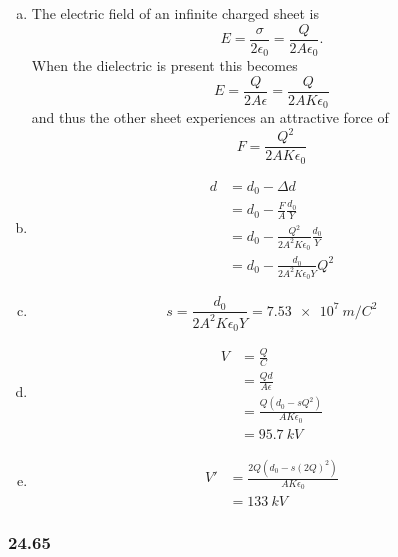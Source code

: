 \documentclass{article}
\begin{document}
\begin{enumerate}[(a)]
  \item The electric field of an infinite charged sheet is \[E = \frac{\sigma}{2 \epsilon_0} = \frac{Q}{2 A \epsilon_0}.\] When the dielectric is present this becomes \[E = \frac{Q}{2 A \epsilon} = \frac{Q}{2 A K \epsilon_0}\] and thus the other sheet experiences an attractive force of \[F = \frac{Q^2}{2 A K \epsilon_0}\]

  \item

        \begin{align*}
          d & = d_0 - \Delta d                                     \\
            & = d_0 - \frac{F}{A} \frac{d_0}{Y}                    \\
            & = d_0 - \frac{Q^2}{2 A^2 K \epsilon_0} \frac{d_0}{Y} \\
            & = d_0 - \frac{d_0}{2 A^2 K \epsilon_0 Y} Q^2
        \end{align*}

  \item \[s = \frac{d_0}{2 A^2 K \epsilon_0 Y} = \qty{7.53e7}{m/C^2}\]

  \item

        \begin{align*}
          V & = \frac{Q}{C}                            \\
            & = \frac{Q d}{A \epsilon}                 \\
            & = \frac{Q (d_0 - s Q^2)}{A K \epsilon_0} \\
            & = \qty{95.7}{kV}
        \end{align*}

  \item

        \begin{align*}
          V' & = \frac{2 Q (d_0 - s (2 Q)^2)}{A K \epsilon_0} \\
             & = \qty{133}{kV}
        \end{align*}
\end{enumerate}

\subsubsection{24.65}
\end{document}
